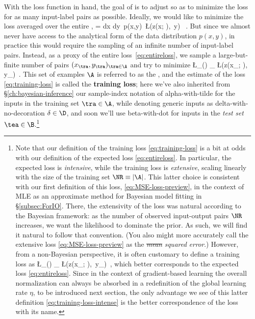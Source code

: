 With the loss function in hand, the goal of  is to adjust  so as to minimize the loss for as many input-label pairs as possible. Ideally, we would like to minimize the loss averaged over the entire ,
\be\label{eq:entireloss}
\E{\L(\theta)} = \int dx dy\, p(x,y)\, \L\Big(z(x; \theta),\, y\Big) \, .
\ee
But since we almost never have access to the analytical form of the data distribution $p(x,y)$, in practice this would require the sampling of an infinite number of input-label pairs. Instead, as a proxy of the entire loss~\eqref{eq:entireloss},
we sample a large-but-finite number of pairs $(x_{\tra}, y_{\tra})_{\tra\in \A}$ and try to minimize
\be\label{eq:training-loss}
\L_\A(\theta) \equiv \sum_{\tra \in \A} \L\Big(z(x_{\tra}; \theta),\, y_{\tra}\Big)\, .
\ee
This set of examples $\A$ is referred to as the , and the estimate of the loss \eqref{eq:training-loss} is called the \textbf{training loss}; 
here we've also inherited from \S\ref{ch:bayesian-inference} our sample-index notation of alpha-with-tilde for the inputs in the training set $\tra \in\A$, while denoting generic inputs as delta-with-no-decoration $\delta\in\D$, and soon we'll  use beta-with-dot for inputs in the \emph{test set} $\tea\in\B$.\footnote{Note that our definition of the training loss \eqref{eq:training-loss} is a bit at odds with our definition of the expected loss \eqref{eq:entireloss}. In particular, the expected loss is \emph{intensive}, while the training loss
is \emph{extensive}, scaling linearly with the size of the training set $\NR \equiv \vert\A\vert$.
This latter choice is consistent with our first definition of this loss, \eqref{eq:MSE-loss-preview}, in the context of MLE as an approximate method for Bayesian model fitting in \S\ref{subsec:ForIO}. There, the extensivity of the loss was natural according to the Bayesian framework: as the number of observed input-output pairs $\NR$ increases, we want the likelihood to dominate the prior. %
As such, we will find it natural to follow that convention. (You also might more accurately call the extensive loss \eqref{eq:MSE-loss-preview} as the \emph{\sout{mean} squared error}.)
However, from a non-Bayesian perspective, it is often customary to define a training loss as
\be\label{eq:training-loss-intense}
\L_\A(\theta) \equiv {}\sum_{\tra \in \A} \L\Big(z(x_{\tra}; \theta),\, y_{\tra}\Big)\, ,
\ee
which better corresponds to the expected loss \eqref{eq:entireloss}. Since in the context of gradient-based learning the overall normalization can always be absorbed in a redefinition of the global learning rate $\eta$, to be introduced next section, the only advantage we see of this latter definition \eqref{eq:training-loss-intense} is the better correspondence of the loss with its name.
}
